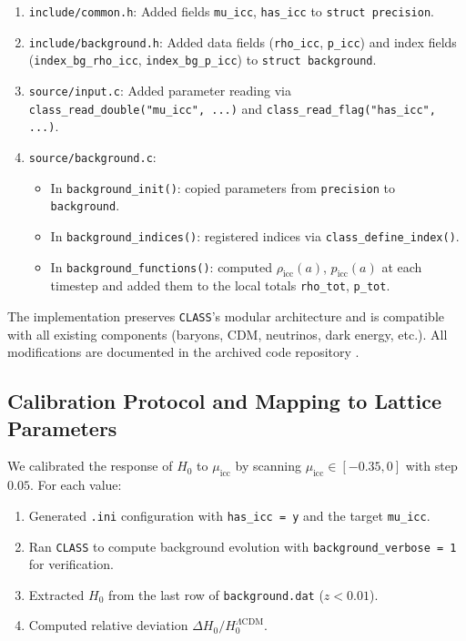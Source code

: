 \documentclass[11pt,a4paper]{article}
\newcommand{\lcdm}{\Lambda\mathrm{CDM}}
\newcommand{\muicc}{\mu_{\mathrm{icc}}}
\newcommand{\class}{\texttt{CLASS}}
\newcommand{\code}[1]{\texttt{#1}}
\begin{document}
\begin{enumerate}[label=\arabic*.]
    \item \code{include/common.h}: Added fields \code{mu\_icc}, \code{has\_icc} to \code{struct precision}.
    \item \code{include/background.h}: Added data fields (\code{rho\_icc}, \code{p\_icc}) and index fields (\code{index\_bg\_rho\_icc}, \code{index\_bg\_p\_icc}) to \code{struct background}.
    \item \code{source/input.c}: Added parameter reading via \code{class\_read\_double("mu\_icc", ...)} and \code{class\_read\_flag("has\_icc", ...)}.
    \item \code{source/background.c}:
    \begin{itemize}
        \item In \code{background\_init()}: copied parameters from \code{precision} to \code{background}.
        \item In \code{background\_indices()}: registered indices via \code{class\_define\_index()}.
        \item In \code{background\_functions()}: computed $\rho_{\text{icc}}(a)$, $p_{\text{icc}}(a)$ at each timestep and added them to the local totals \code{rho\_tot}, \code{p\_tot}.
    \end{itemize}
\end{enumerate}

The implementation preserves \class{}'s modular architecture and is compatible with all existing components (baryons, CDM, neutrinos, dark energy, etc.). All modifications are documented in the archived code repository \cite{gimranov2026roadmap}.

\subsection{Calibration Protocol and Mapping to Lattice Parameters}
\label{subsec:calibration}

We calibrated the response of $H_0$ to $\muicc$ by scanning $\muicc \in [-0.35, 0]$ with step $0.05$. For each value:
\begin{enumerate}[label=\alph*.]
    \item Generated \code{.ini} configuration with \code{has\_icc = y} and the target \code{mu\_icc}.
    \item Ran \class{} to compute background evolution with \code{background\_verbose = 1} for verification.
    \item Extracted $H_0$ from the last row of \code{background.dat} ($z < 0.01$).
    \item Computed relative deviation $\Delta H_0 / H_0^{\lcdm}$.
\end{enumerate}
\end{document}
